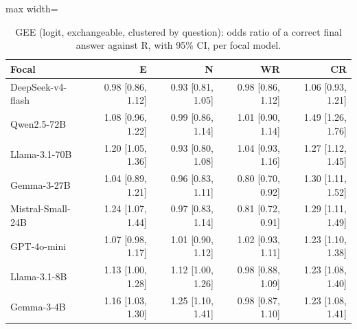 \begin{table}[t]
\centering
\caption{GEE (logit, exchangeable, clustered by question): odds ratio of a correct final answer against R, with 95\% CI, per focal model.}
\label{tab:gee}
\begin{adjustbox}{max width=\linewidth}
\small
\begin{tabular}{@{}lrrrr@{}}
\toprule
Focal & E & N & WR & CR \\
\midrule
DeepSeek-v4-flash & 0.98 [0.86, 1.12] & 0.93 [0.81, 1.05] & 0.98 [0.86, 1.12] & 1.06 [0.93, 1.21] \\
Qwen2.5-72B & 1.08 [0.96, 1.22] & 0.99 [0.86, 1.14] & 1.01 [0.90, 1.14] & 1.49 [1.26, 1.76] \\
Llama-3.1-70B & 1.20 [1.05, 1.36] & 0.93 [0.80, 1.08] & 1.04 [0.93, 1.16] & 1.27 [1.12, 1.45] \\
Gemma-3-27B & 1.04 [0.89, 1.21] & 0.96 [0.83, 1.11] & 0.80 [0.70, 0.92] & 1.30 [1.11, 1.52] \\
Mistral-Small-24B & 1.24 [1.07, 1.44] & 0.97 [0.83, 1.14] & 0.81 [0.72, 0.91] & 1.29 [1.11, 1.49] \\
GPT-4o-mini & 1.07 [0.98, 1.17] & 1.01 [0.90, 1.12] & 1.02 [0.93, 1.11] & 1.23 [1.10, 1.38] \\
Llama-3.1-8B & 1.13 [1.00, 1.28] & 1.12 [1.00, 1.26] & 0.98 [0.88, 1.09] & 1.23 [1.08, 1.40] \\
Gemma-3-4B & 1.16 [1.03, 1.30] & 1.25 [1.10, 1.41] & 0.98 [0.87, 1.10] & 1.23 [1.08, 1.41] \\
\bottomrule
\end{tabular}
\end{adjustbox}
\end{table}
